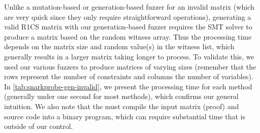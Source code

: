 Unlike a mutation-based or generation-based fuzzer for an invalid matrix (which are very quick since they only require straightforward operations), generating a valid R1CS matrix with our generation-based fuzzer requires the SMT solver to produce a matrix based on the random witness array. Thus the processing time depends on the matrix size and random value(s) in the witness list, which generally results in a larger matrix taking longer to process.
To validate this, we used our various fuzzers to produce matrices of varying sizes (remember that the rows represent the number of constraints and columns the number of variables). In \autoref{tab:snarkprobe-gen-invalid}, we present the processing time for each method (generally under one second for most methods), which confirms our general intuition.
We also note that the  must compile the input matrix (proof) and source code into a binary program, which can require substantial time that is outside of our control.


